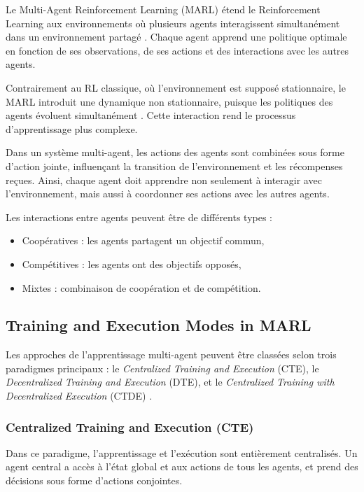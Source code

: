 \documentclass[12pt,a4paper]{report}
\begin{document}
Le Multi-Agent Reinforcement Learning (MARL) étend le Reinforcement Learning aux environnements où plusieurs agents interagissent simultanément dans un environnement partagé \cite{albrecht2024marl}. Chaque agent apprend une politique optimale en fonction de ses observations, de ses actions et des interactions avec les autres agents.

Contrairement au RL classique, où l’environnement est supposé stationnaire, le MARL introduit une dynamique non stationnaire, puisque les politiques des agents évoluent simultanément \cite{albrecht2024marl}. Cette interaction rend le processus d’apprentissage plus complexe.

Dans un système multi-agent, les actions des agents sont combinées sous forme d’action jointe, influençant la transition de l’environnement et les récompenses reçues. Ainsi, chaque agent doit apprendre non seulement à interagir avec l’environnement, mais aussi à coordonner ses actions avec les autres agents.

Les interactions entre agents peuvent être de différents types :
\begin{itemize}
    \item Coopératives : les agents partagent un objectif commun,
    \item Compétitives : les agents ont des objectifs opposés,
    \item Mixtes : combinaison de coopération et de compétition.
\end{itemize}

\subsection{Training and Execution Modes in MARL}

Les approches de l’apprentissage multi-agent peuvent être classées selon trois paradigmes principaux : le \textit{Centralized Training and Execution} (CTE), le \textit{Decentralized Training and Execution} (DTE), et le \textit{Centralized Training with Decentralized Execution} (CTDE) \cite{zhang2021marl}.

\subsubsection{Centralized Training and Execution (CTE)}

Dans ce paradigme, l’apprentissage et l’exécution sont entièrement centralisés. Un agent central a accès à l’état global et aux actions de tous les agents, et prend des décisions sous forme d’actions conjointes.
\end{document}
